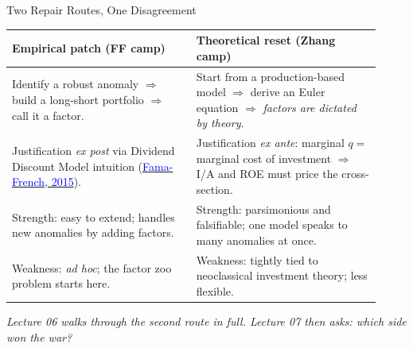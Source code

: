 \documentclass{beamer}
\begin{document}
\begin{frame}{Two Repair Routes, One Disagreement}
	\small
	\begin{tabular}{@{}p{0.46\linewidth}p{0.46\linewidth}@{}}
		\toprule
		\textbf{Empirical patch (FF camp)} & \textbf{Theoretical reset (Zhang camp)} \\
		\midrule
		Identify a robust anomaly $\Rightarrow$ build a long-short portfolio $\Rightarrow$ call it a factor. & Start from a production-based model $\Rightarrow$ derive an Euler equation $\Rightarrow$ \textit{factors are dictated by theory}. \\
		\addlinespace
		Justification \textit{ex post} via Dividend Discount Model intuition (\href{https://doi.org/10.1016/j.jfineco.2014.10.010}{\textcolor{blue}{Fama-French, 2015}}). & Justification \textit{ex ante}: marginal $q = $ marginal cost of investment $\Rightarrow$ I/A and ROE must price the cross-section. \\
		\addlinespace
		Strength: easy to extend; handles new anomalies by adding factors. & Strength: parsimonious and falsifiable; one model speaks to many anomalies at once. \\
		\addlinespace
		Weakness: \textit{ad hoc}; the factor zoo problem starts here. & Weakness: tightly tied to neoclassical investment theory; less flexible. \\
		\bottomrule
	\end{tabular}
	\vspace{4pt}
	\begin{center}
		\footnotesize \textit{Lecture 06 walks through the second route in full. Lecture 07 then asks: which side won the war?}
	\end{center}
\end{frame}

\end{document}
